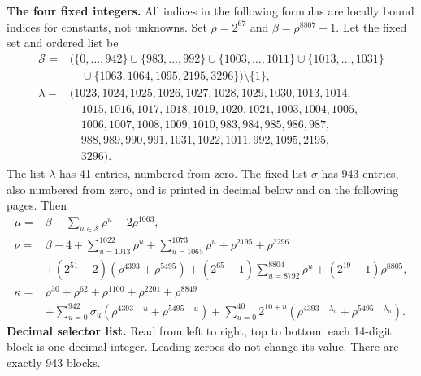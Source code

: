 \documentclass[10pt]{article}
\begin{document}
\clearpage
\textbf{The four fixed integers.} All indices in the following formulas are
locally bound indices for constants, not unknowns. Set \(\rho=2^{67}\) and
\(\beta=\rho^{8807}-1\). Let the fixed set and ordered list be
\[
\begin{aligned}
\mathcal S={}&\bigl(\{0,\ldots,942\}\cup\{983,\ldots,992\}\cup
\{1003,\ldots,1011\}\cup\{1013,\ldots,1031\}\\
&\quad\cup\{1063,1064,1095,2195,3296\}\bigr)\setminus\{1\},\\
\lambda={}&(1023,1024,1025,1026,1027,1028,1029,1030,1013,1014,\\
&\quad 1015,1016,1017,1018,1019,1020,1021,1003,1004,1005,\\
&\quad 1006,1007,1008,1009,1010,983,984,985,986,987,\\
&\quad 988,989,990,991,1031,1022,1011,992,1095,2195,\\
&\quad 3296).
\end{aligned}
\]
The list \(\lambda\) has 41 entries, numbered from zero. The fixed list
\(\sigma\) has 943 entries, also numbered from zero, and is printed in
decimal below and on the following pages. Then
\[
\begin{aligned}
\mu={}&\beta-\sum_{u\in\mathcal S}\rho^u-2\rho^{1063},\\
\nu={}&\beta+4+\sum_{u=1013}^{1022}\rho^u+\sum_{u=1065}^{1073}\rho^u
 +\rho^{2195}+\rho^{3296}\\
&+(2^{51}-2)(\rho^{4393}+\rho^{5495})
 +(2^{65}-1)\sum_{u=8792}^{8804}\rho^u+(2^{19}-1)\rho^{8805},\\
\kappa={}&\rho^{30}+\rho^{62}+\rho^{1100}+\rho^{2201}+\rho^{8849}\\
&+\sum_{u=0}^{942}\sigma_u(\rho^{4393-u}+\rho^{5495-u})
 +\sum_{u=0}^{40}2^{10+u}(\rho^{4393-\lambda_u}+\rho^{5495-\lambda_u}).
\end{aligned}
\]
\textbf{Decimal selector list.} Read from left to right, top to bottom;
each 14-digit block is one decimal integer. Leading zeroes do not change its
value. There are exactly 943 blocks.
\end{document}
